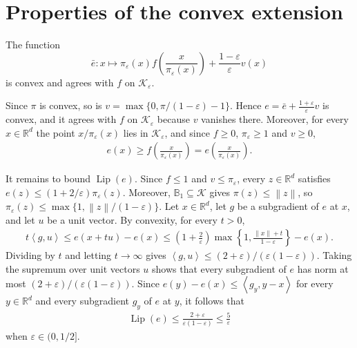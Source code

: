 \documentclass[12pt,cleveref]{jmlr}
\newcommand{\R}{\mathbb R}
\newcommand{\K}{\mathcal K}
\newcommand{\Lip}{\operatorname{Lip}}
\newcommand{\1}{\mathbf 1}
\newcommand{\eps}{\varepsilon}
\newcommand{\ip}[2]{\left\langle #1,#2\right\rangle}
\newcommand{\norm}[1]{\left\lVert #1\right\rVert}
\begin{document}
\section{Properties of the convex extension}
\label{app:extension}
\begin{lemma}
    \label{lem:extension}
    The function
    \[
        \bar{e}:
        x
        \longmapsto
        \pi_\eps(x)
        f\!\left(\frac{x}{\pi_\eps(x)}\right)
        +
        \frac{1-\eps}{\eps}v(x)
    \]
    is convex and agrees with $f$ on $\K_\eps$.
\end{lemma}
Since $\pi$ is convex, so is $v=\max\{0,\pi/(1-\eps)-1\}$.
Hence $e=\bar e+\frac{1+\eps}{\eps}v$ is convex, and it agrees with $f$ on $\K_\eps$ because $v$ vanishes there.
Moreover, for every $x\in\R^d$ the point $x/\pi_\eps(x)$ lies in $\K_\eps$, and since $f\geq0$, $\pi_\eps\geq1$ and $v\geq0$,
\begin{align}
    e(x)
    \geq f\!\left(\frac{x}{\pi_\eps(x)}\right)
    =e\!\left(\frac{x}{\pi_\eps(x)}\right).
\end{align}

It remains to bound $\Lip(e)$.
Since $f\leq1$ and $v\leq\pi_\eps$, every $z\in\R^d$ satisfies $e(z)\leq(1+2/\eps)\pi_\eps(z)$.
Moreover, $\mathbb B_1\subseteq\K$ gives $\pi(z)\leq\norm z$, so $\pi_\eps(z)\leq\max\{1,\norm z/(1-\eps)\}$.
Let $x\in\R^d$, let $g$ be a subgradient of $e$ at $x$, and let $u$ be a unit vector.
By convexity, for every $t>0$,
\begin{align}
    t\ip gu
    \leq e(x+tu)-e(x)
    \leq\left(1+\frac2\eps\right)\max\left\{1,\frac{\norm x+t}{1-\eps}\right\}-e(x).
\end{align}
Dividing by $t$ and letting $t\to\infty$ gives $\ip gu\leq(2+\eps)/(\eps(1-\eps))$.
Taking the supremum over unit vectors $u$ shows that every subgradient of $e$ has norm at most $(2+\eps)/(\eps(1-\eps))$.
Since $e(y)-e(x)\leq\ip{g_y}{y-x}$ for every $y\in\R^d$ and every subgradient $g_y$ of $e$ at $y$, it follows that
\begin{align}
    \Lip(e)\leq\frac{2+\eps}{\eps(1-\eps)}\leq\frac5\eps
\end{align}
when $\eps\in(0,1/2]$.
\end{document}
